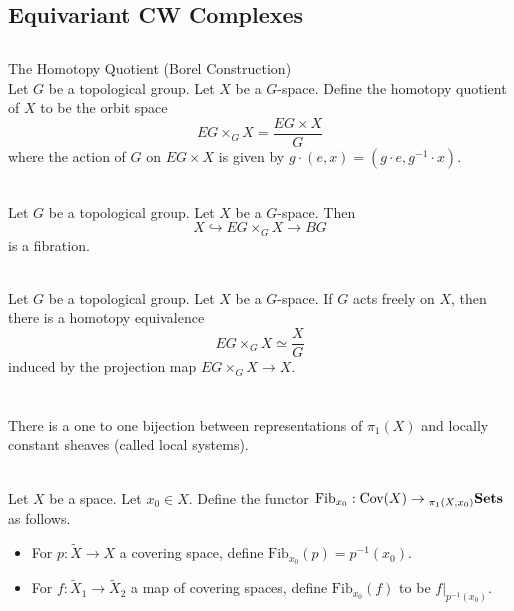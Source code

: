 \documentclass[a4paper]{article}
\begin{document}
\subsection{Equivariant CW Complexes}
\subsection{}
\begin{defn}{The Homotopy Quotient (Borel Construction)}{}\\
Let $G$ be a topological group. Let $X$ be a $G$-space. Define the homotopy quotient of $X$ to be the orbit space $$EG\times_GX=\frac{EG\times X}{G}$$ where the action of $G$ on $EG\times X$ is given by $g\cdot(e,x)=(g\cdot e,g^{-1}\cdot x)$. 
\end{defn}

\begin{prp}{}{}\\
Let $G$ be a topological group. Let $X$ be a $G$-space. Then $$X\hookrightarrow EG\times_GX\to BG$$ is a fibration. 
\end{prp}

\begin{lmm}{}{}\\
Let $G$ be a topological group. Let $X$ be a $G$-space. If $G$ acts freely on $X$, then there is a homotopy equivalence $$EG\times_GX\simeq\frac{X}{G}$$ induced by the projection map $EG\times_GX\to X$. 
\end{lmm}

\pagebreak
\section{}
There is a one to one bijection between representations of $\pi_1(X)$ and locally constant sheaves (called local systems). 

\begin{defn}{}{}\\
Let $X$ be a space. Let $x_0\in X$. Define the functor $\text{Fib}_{x_0}:\text{Cov}(X)\to{_{\pi_1(X,x_0)}}\bold{Sets}$ as follows. 
\begin{itemize}
\item For $p:\widetilde{X}\to X$ a covering space, define $\text{Fib}_{x_0}(p)=p^{-1}(x_0)$. 
\item For $f:\widetilde{X}_1\to\widetilde{X}_2$ a map of covering spaces, define $\text{Fib}_{x_0}(f)$ to be $f|_{p^{-1}(x_0)}$. 
\end{itemize}
\end{defn}
\end{document}
